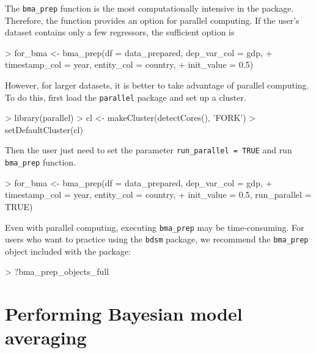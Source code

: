 \documentclass[a4paper]{article}
\begin{document}
The \verb+bma_prep+ function is the most computationally intensive in the package.
Therefore, the function provides an option for parallel computing.
If the user's dataset contains only a few regressors, the sufficient option is
\begin{Schunk}
\begin{Sinput}
> for_bma <- bma_prep(df = data_prepared, dep_var_col = gdp,
+                    timestamp_col = year, entity_col = country,
+                    init_value = 0.5)
\end{Sinput}
\end{Schunk}
However, for larger datasets, it is better to take advantage of parallel computing.
To do this, first load the \verb+parallel+ package and set up a cluster.
\begin{Schunk}
\begin{Sinput}
> library(parallel)
> cl <- makeCluster(detectCores(), 'FORK')
> setDefaultCluster(cl)
\end{Sinput}
\end{Schunk}
Then the user just need to set the parameter \verb+run_parallel = TRUE+ and run \verb+bma_prep+ function.
\begin{Schunk}
\begin{Sinput}
> for_bma <- bma_prep(df = data_prepared, dep_var_col = gdp,
+                    timestamp_col = year, entity_col = country,
+                    init_value = 0.5, run_parallel = TRUE)
\end{Sinput}
\end{Schunk}
Even with parallel computing, executing \verb+bma_prep+ may be time-consuming.
For users who want to practice using the \verb+bdsm+ package, we recommend the \verb+bma_prep+ object included with the package:
\begin{Schunk}
\begin{Sinput}
> ?bma_prep_objects_full
\end{Sinput}
\end{Schunk}

\section{Performing Bayesian model averaging}\label{using_bma}
\end{document}
